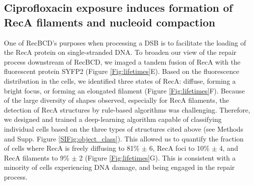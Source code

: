 \subsection*{Ciprofloxacin exposure induces formation of RecA filaments and nucleoid compaction}

One of RecBCD's purposes when processing a DSB is to facilitate the loading of the RecA protein on single-stranded DNA. To broaden our view of the repair process downstream of RecBCD, we imaged a tandem fusion of RecA with the fluorescent protein SYFP2 (Figure \ref{Fig:lifetimes}E).\cite{Wiktor2021} Based on the fluorescence distribution in the cells, we identified three states of RecA: diffuse, forming a bright focus, or forming an elongated filament (Figure \ref{Fig:lifetimes}F). Because of the large diversity of shapes observed, especially for RecA filaments, the detection of RecA structures by rule-based algorithms was challenging. Therefore, we designed and trained a deep-learning algorithm capable of classifying individual cells based on the three types of structures cited above (see Methods and Supp. Figure \ref{SIFig:object_class}). This allowed us to quantify the fraction of cells where RecA is freely diffusing to 81\% $\pm$ 6, RecA foci to 10\% $\pm$ 4, and RecA filaments to 9\% $\pm$ 2 (Figure \ref{Fig:lifetimes}G). This is consistent with a minority of cells experiencing DNA damage, and being engaged in the repair process.

